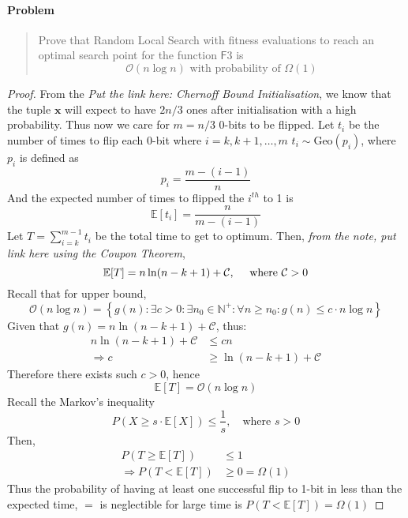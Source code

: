 \documentclass[a4paper, 12pt]{article}
\begin{document}
\paragraph{Problem}
    \begin{quote}
        Prove that Random Local Search with fitness evaluations to reach an optimal search point for the function $\mathsf{F}$3 is 
        \[
            \mathcal{O}(n\log n)
            \text{ with probability of }
            \Omega(1)
        \]
    \end{quote}
\begin{proof}
    From the \emph{Put the link here: Chernoff Bound Initialisation}, we know that the tuple $\mathbf{x}$ will expect to have $2n/3$ ones after initialisation
    with a high probability. Thus now we care for $m = n/3$ 0-bits to be flipped. Let $t_i$ be the number of times to flip each 0-bit where $i = k,k+1,\ldots,m$
    $t_i\sim\text{Geo}(p_i)$, where $p_i$ is defined as
    \begin{equation*}
        p_i = \frac{m - (i-1)}{n}
    \end{equation*}
    And the expected number of times to flipped the $i^{th}$ to 1 is 
    \begin{equation*}
        \mathbb{E}[t_i] = \frac{n}{m - (i-1)}
    \end{equation*}
    Let $T = \sum_{i=k}^{m-1}t_i$ be the total time to get to optimum. Then, \emph{from the note, put link here using the Coupon Theorem},
    \begin{equation*}
        \mathbb{E}[T] = n\ln(n-k+1) + \mathcal{C},\quad\text{ where $\mathcal{C} > 0$}\\
    \end{equation*}
    Recall that for upper bound,
    \begin{equation*}
        \mathcal{O}(n\log n) = \left\{g(n): \exists c>0: \exists n_0\in\mathbb{N}^+: \forall n\geq n_0: g(n)\leq c\cdot n\log n\right\}
    \end{equation*}
    Given that $g(n) =  n\ln(n-k+1) + \mathcal{C}$, thus:
    \begin{align*}
        n\ln(n-k+1) + \mathcal{C} &\leq cn\\
        \Rightarrow c&\geq\ln(n-k+1) + \mathcal{C}
    \end{align*}
    Therefore there exists such $c>0$, hence
    \begin{equation*}
        \mathbb{E}[T] = \mathcal{O}(n\log n)
    \end{equation*}
    Recall the Markov's inequality
    \begin{equation*}
        P(X\geq s\cdot\mathbb{E}[X])\leq \frac{1}{s},\quad\text{where } s>0
    \end{equation*}
    Then,
    \begin{align*}
        P(T\geq\mathbb{E}[T])&\leq 1\\
        \Rightarrow P(T < \mathbb{E}[T]) &\geq 0 = \Omega(1)
    \end{align*}
    Thus the probability of having at least one successful flip to 1-bit in less than the expected time, $=$ is neglectible for large time is
    $P(T < \mathbb{E}[T])=\Omega(1)$
\end{proof}
\end{document}
